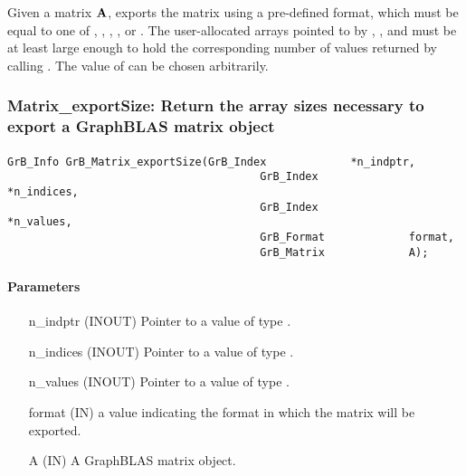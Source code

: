 Given a matrix ${\bf A}$, exports the matrix using a pre-defined
 format, which must be equal to one of ,
, , ,
or .
The user-allocated arrays
pointed to by , , and  must be at least
large enough to hold the corresponding number of values returned by calling
.  The value of  can be chosen arbitrarily.


\subsubsection{{\sf Matrix\_exportSize}: Return the array sizes necessary to export a GraphBLAS matrix object }
\label{Sec:Matrix_exportSize}

\paragraph{\syntax}

\begin{Verbatim}[samepage=true]    
        GrB_Info GrB_Matrix_exportSize(GrB_Index             *n_indptr,
                                       GrB_Index             *n_indices,
                                       GrB_Index             *n_values,
                                       GrB_Format             format,
                                       GrB_Matrix             A);
\end{Verbatim}

\paragraph{Parameters}

\begin{itemize}[leftmargin=1.1in]
    \item[{\sf n\_indptr}] ({\sf INOUT}) Pointer to a value of type .
    \item[{\sf n\_indices}] ({\sf INOUT}) Pointer to a value of type .
    \item[{\sf n\_values}] ({\sf INOUT}) Pointer to a value of type .
    \item[{\sf format}] ({\sf IN}) a value indicating the format in which the matrix will be exported.
    \item[{\sf A}]      ({\sf IN}) A GraphBLAS matrix object.
\end{itemize}

